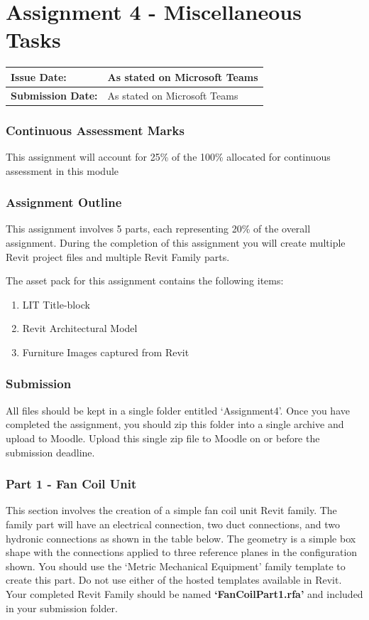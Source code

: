 
	
\part*{Assignment 4 - Miscellaneous Tasks}

\begin{tabularx}{\textwidth}{ |X|X| }
	\hline
	\textbf{Issue Date:} & As stated on Microsoft Teams\\
	\hline 
	\textbf{Submission Date:}  & As stated on Microsoft Teams\\
	\hline
\end{tabularx}

\section*{Continuous Assessment Marks}
This assignment will account for 25\% of the 100\% allocated for continuous assessment in this module

\section*{Assignment Outline}
This assignment involves 5 parts, each representing 20\% of the overall assignment. During the completion of this assignment you will create multiple Revit project files and multiple Revit Family parts.


The asset pack for this assignment contains the following items:
\begin{enumerate}
	\item LIT Title-block
	\item Revit Architectural Model
	\item Furniture Images captured from Revit
\end{enumerate}


\section*{Submission}
All files should be kept in a single folder entitled ‘Assignment4’. Once you have completed the assignment, you should zip this folder into a single archive and upload to Moodle. Upload this single zip file to Moodle on or before the submission deadline.





\newpage

\section*{Part 1 - Fan Coil Unit}
This section involves the creation of a simple fan coil unit Revit family. The family part will have an electrical connection, two duct connections, and two hydronic connections as shown in the table below. The geometry is a simple box shape with the connections applied to three reference planes in the configuration shown. You should use the ‘Metric Mechanical Equipment’ family template to create this part. Do not use either of the hosted templates available in Revit.  Your completed Revit Family should be named \textbf{‘FanCoilPart1.rfa’} and included in your submission folder.\\

